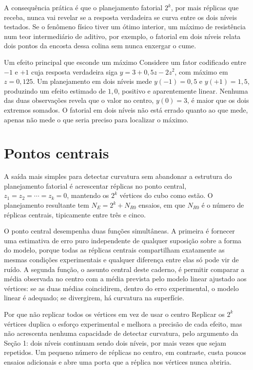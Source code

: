 \documentclass{doeapostila}
\begin{document}
A consequência prática é que o planejamento fatorial $2^{k}$, por mais
réplicas que receba, nunca vai revelar se a resposta verdadeira se curva
entre os dois níveis testados. Se o fenômeno físico tiver um ótimo interior,
um máximo de resistência num teor intermediário de aditivo, por exemplo, o
fatorial em dois níveis relata dois pontos da encosta dessa colina sem nunca
enxergar o cume.

\begin{aplicacao}{Um efeito principal que esconde um máximo}
Considere um fator codificado entre $-1$ e $+1$ cuja resposta verdadeira siga
$y = 3 + 0{,}5z - 2z^{2}$, com máximo em $z=0{,}125$. Um planejamento em dois
níveis mede $y(-1) = 0{,}5$ e $y(+1) = 1{,}5$, produzindo um efeito estimado
de $1{,}0$, positivo e aparentemente linear. Nenhuma das duas observações
revela que o valor no centro, $y(0) = 3$, é maior que os dois extremos
somados. O fatorial em dois níveis não está errado quanto ao que mede, apenas
não mede o que seria preciso para localizar o máximo.
\end{aplicacao}

\section{Pontos centrais}

A saída mais simples para detectar curvatura sem abandonar a estrutura do
planejamento fatorial é acrescentar réplicas no ponto central, $z_{1} =
z_{2} = \cdots = z_{k} = 0$, mantendo os $2^{k}$ vértices do cubo como estão.
O planejamento resultante tem $N_{E} = 2^{k} + N_{R0}$ ensaios, em que
$N_{R0}$ é o número de réplicas centrais, tipicamente entre três e cinco.

O ponto central desempenha duas funções simultâneas. A primeira é fornecer
uma estimativa de erro puro independente de qualquer suposição sobre a forma
do modelo, porque todas as réplicas centrais compartilham exatamente as
mesmas condições experimentais e qualquer diferença entre elas só pode vir de
ruído. A segunda função, o assunto central deste caderno, é permitir comparar
a média observada no centro com a média prevista pelo modelo linear ajustado
aos vértices: se as duas médias coincidirem, dentro do erro experimental, o
modelo linear é adequado; se divergirem, há curvatura na superfície.

\begin{aplicacao}{Por que não replicar todos os vértices em vez de usar o centro}
Replicar os $2^{k}$ vértices duplica o esforço experimental e melhora a
precisão de cada efeito, mas não acrescenta nenhuma capacidade de detectar
curvatura, pelo argumento da Seção 1: dois níveis continuam sendo dois
níveis, por mais vezes que sejam repetidos. Um pequeno número de réplicas no
centro, em contraste, custa poucos ensaios adicionais e abre uma porta que a
réplica nos vértices nunca abriria.
\end{aplicacao}
\end{document}
